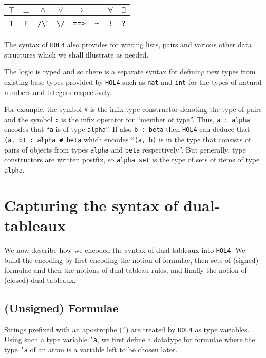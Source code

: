 \documentclass[a4paper]{article}
\newcommand{\hol}{\texttt{HOL4}}
\begin{document}
\begin{center}
\begin{tabular}[c]{|c|c|c|c|c|c|c|c|}
\hline
 $\top$ & $\bot$ & $\land$ & $\lor$ & $\to$ & $\lnot$ & $\forall$ & $\exists$
\\ \hline
 \texttt{T} & \texttt{F} & \verb!/\! & \verb!\/! & \texttt{==>} & \verb!~! & \texttt{!} & \texttt{?} 
\\ \hline
\end{tabular}
\end{center}


The syntax of \hol{} also provides for writing lists, pairs and various other
data structures which we shall illustrate as needed. 

The logic is typed and so there is a separate syntax for defining new
types from existing base types provided by \hol{} such as \texttt{nat}
and \texttt{int} for the types of natural numbers and integers
respectively. 

For example, the symbol \texttt{\#} is the infix type constructor
denoting the type of pairs and the symbol \texttt{:} is the infix
operator for ``member of type''. Thus, \mbox{\texttt{a :\ alpha}} encodes that
``\texttt{a} is of type \texttt{alpha}''. 
If also \mbox{\texttt{b :\ beta}} then \hol{}
can deduce that \texttt{(a, b) :\ alpha \# beta} which encodes
``\texttt{(a, b)} is in the type that consists of pairs of objects from
types \texttt{alpha} and \texttt{beta} respectively''.  But generally,
type constructors are written postfix, so \texttt{alpha set} is the type
of sets of items of type \texttt{alpha}.

\section{Capturing the syntax of dual-tableaux}

We now describe how we encoded the syntax of dual-tableaux into \hol.
We build the encoding by first encoding the notion of formulae,
then sets of (signed) formulae and then the notions of dual-tableau
rules, and finally the notion of (closed) dual-tableaux.

\subsection{(Unsigned) Formulae}
\label{sec:unsigned-formulae}

Strings prefixed with an apostrophe (\texttt{'}) are treated by
\hol{} as type variables.  Using such a type variable \texttt{'a}, we
first define a datatype for formulae where the type \texttt{'a} of an
atom is a variable left to be chosen later.
\end{document}
